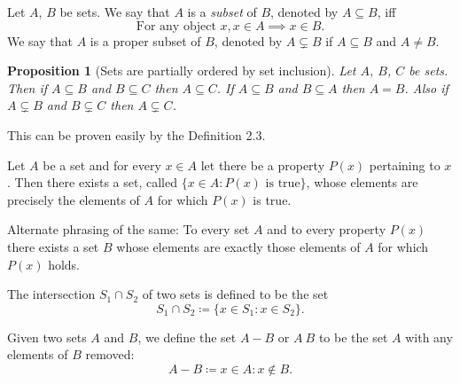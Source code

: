 \documentclass[12pt]{article}
\newtheorem{proposition}{Proposition}[section]
\theoremstyle{remark}
\begin{document}
\begin{definition}[Subsets]
	Let $ A $, $ B $ be sets. We say that $ A $ is a \textit{subset} of $ B $, denoted by $ A \subseteq B $, iff \[ \text{For any object } x, x \in A \implies x \in B. \]
	We say that $ A $ is a proper subset of $ B $, denoted by $ A \subsetneq B $ if $ A \subseteq B $ and $ A \neq B $.
\end{definition}


\begin{proposition}[Sets are partially ordered by set inclusion]
    Let $ A $, $ B $, $ C $ be sets. Then if $ A \subseteq B $ and $ B \subseteq C $ then $ A \subseteq C $. If $ A \subseteq B $ and $ B \subseteq A $ then $ A = B $. Also if $ A \subsetneq B $ and $ B \subsetneq C $ then $ A \subsetneq C $.
\end{proposition}

This can be proven easily by the Definition 2.3.

\begin{important}
	Let $ A $ be a set and for every $ x \in A $ let there be a property $ P(x) $ pertaining to $ x $. Then there exists a set, called $ \{ x \in A : P(x) \text{ is true} \} $, whose elements are precisely the elements of $ A $ for which $ P(x) $ is true.  
\end{important}

Alternate phrasing of the same: To every set $ A $ and to every property $ P(x) $ there exists a set $ B $ whose elements are exactly those elements of $ A $ for which $ P(x) $ holds. 

\begin{definition}[Intersections]
	The intersection $ S_{1} \cap S_{2} $ of two sets is defined to be the set 
	\begin{equation*}
		S_{1} \cap S_{2} \coloneqq \{ x \in S_{1} : x \in S_{2} \}.
	\end{equation*}
\end{definition}

\begin{definition}
    Given two sets $ A $ and $ B $, we define the set $ A - B $ or $ A \ B $ to be the set $ A $ with any elements of $ B $ removed: 
    \begin{equation*}
        A - B \coloneqq {x \in A : x \notin B}.
    \end{equation*}
\end{definition}
\end{document}
